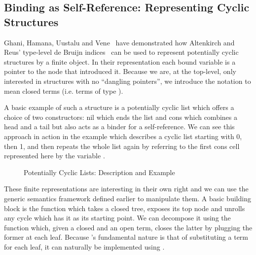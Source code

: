 
\subsection{Binding as Self-Reference: Representing Cyclic Structures}

Ghani, Hamana, Uustalu and Vene~\cite{ghani2006representing} have
demonstrated how Altenkirch and Reus' type-level de Bruijn
indices~\cite{altenkirch1999monadic} can be used to represent
potentially cyclic structures by a finite object. In their
representation each bound variable is a pointer to the node
that introduced it. Because we are, at the top-level, only
interested in structures with no ``dangling pointers'', we introduce
the notation   to mean closed terms (i.e. terms of type
   ).

A basic example of such a structure is a potentially cyclic list which
offers a choice of two constructors: nil which ends the list and cons
which combines a head and a tail but also acts as a binder for a
self-reference. We can see this approach in action in the example 
which describes a cyclic list starting with 0, then 1, and then
repeats the whole list again by referring to the first cons cell
represented here by the variable  .

\begin{figure}[h]
\begin{minipage}{0.45\textwidth}
\end{minipage}\hspace{2em}
\begin{minipage}{0.45\textwidth}
\end{minipage}
\caption{Potentially Cyclic Lists: Description and Example}
\end{figure}

These finite representations are interesting in their own right
and we can use the generic semantics framework defined earlier
to manipulate them. A basic building block is the 
function which takes a closed tree, exposes its top node and
unrolls any cycle which has it as its starting point. We can
decompose it using the  function which, given a closed
and an open term, closes the latter by plugging the former at
each  leaf. Because 's fundamental nature
is that of substituting a term for each leaf, it can naturally
be implemented using .

